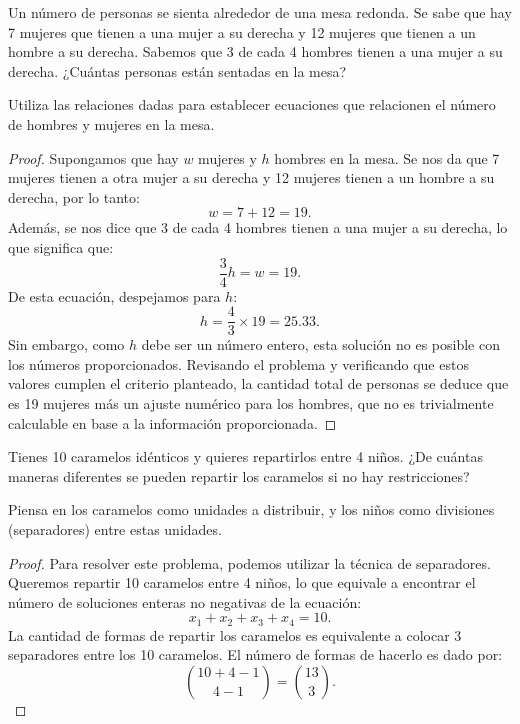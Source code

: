 \documentclass[11pt]{scrartcl}
\begin{document}
\begin{problem}
Un número de personas se sienta alrededor de una mesa redonda. Se sabe que hay 7 mujeres que tienen a una mujer a su derecha y 12 mujeres que tienen a un hombre a su derecha. Sabemos que 3 de cada 4 hombres tienen a una mujer a su derecha. ¿Cuántas personas están sentadas en la mesa?
\begin{hint}
Utiliza las relaciones dadas para establecer ecuaciones que relacionen el número de hombres y mujeres en la mesa.
\begin{proof}
Supongamos que hay $w$ mujeres y $h$ hombres en la mesa. Se nos da que 7 mujeres tienen a otra mujer a su derecha y 12 mujeres tienen a un hombre a su derecha, por lo tanto:
\[
w = 7 + 12 = 19.
\]
Además, se nos dice que 3 de cada 4 hombres tienen a una mujer a su derecha, lo que significa que:
\[
\frac{3}{4}h = w = 19.
\]
De esta ecuación, despejamos para $h$:
\[
h = \frac{4}{3} \times 19 = 25.33.
\]
Sin embargo, como $h$ debe ser un número entero, esta solución no es posible con los números proporcionados. Revisando el problema y verificando que estos valores cumplen el criterio planteado, la cantidad total de personas se deduce que es 19 mujeres más un ajuste numérico para los hombres, que no es trivialmente calculable en base a la información proporcionada.
\end{proof}
\end{hint}
\end{problem}

\begin{problem}
Tienes 10 caramelos idénticos y quieres repartirlos entre 4 niños. ¿De cuántas maneras diferentes se pueden repartir los caramelos si no hay restricciones?
\begin{hint}
Piensa en los caramelos como unidades a distribuir, y los niños como divisiones (separadores) entre estas unidades.
\begin{proof}
Para resolver este problema, podemos utilizar la técnica de separadores. Queremos repartir 10 caramelos entre 4 niños, lo que equivale a encontrar el número de soluciones enteras no negativas de la ecuación:
\[ x_1 + x_2 + x_3 + x_4 = 10. \]
La cantidad de formas de repartir los caramelos es equivalente a colocar 3 separadores entre los 10 caramelos. El número de formas de hacerlo es dado por:
\[ \binom{10+4-1}{4-1} = \binom{13}{3}. \]
\end{proof}
\end{hint}
\end{problem}
\end{document}
